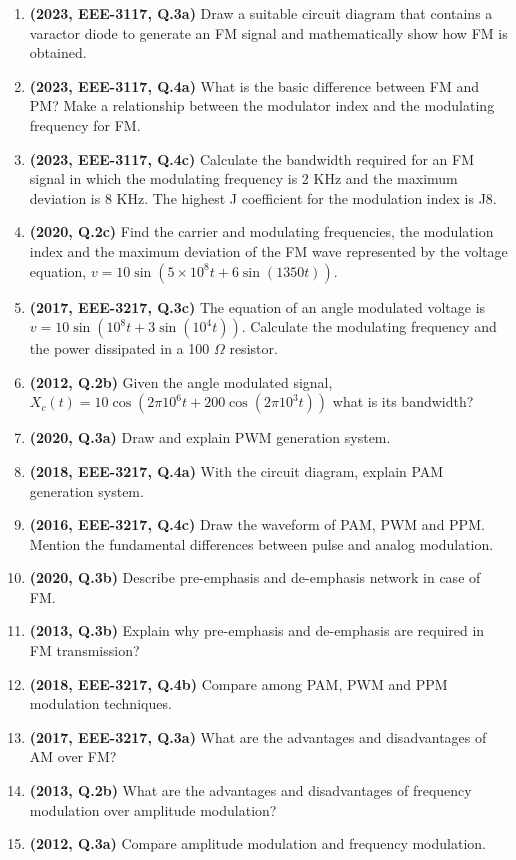 \documentclass[12pt, a4paper]{article}
\begin{document}
	\begin{enumerate}
		\item \textbf{(2023, EEE-3117, Q.3a)} Draw a suitable circuit diagram that contains a varactor diode to generate an FM signal and mathematically show how FM is obtained.
		\item \textbf{(2023, EEE-3117, Q.4a)} What is the basic difference between FM and PM? Make a relationship between the modulator index and the modulating frequency for FM.
		\item \textbf{(2023, EEE-3117, Q.4c)} Calculate the bandwidth required for an FM signal in which the modulating frequency is 2 KHz and the maximum deviation is 8 KHz. The highest J coefficient for the modulation index is J8.
		\item \textbf{(2020, Q.2c)} Find the carrier and modulating frequencies, the modulation index and the maximum deviation of the FM wave represented by the voltage equation, $v = 10\sin(5 \times 10^8 t + 6\sin(1350t))$.
		\item \textbf{(2017, EEE-3217, Q.3c)} The equation of an angle modulated voltage is $v = 10\sin(10^8t + 3\sin(10^4t))$. Calculate the modulating frequency and the power dissipated in a 100 $\Omega$ resistor.
		\item \textbf{(2012, Q.2b)} Given the angle modulated signal, $X_c(t) = 10\cos(2\pi 10^6 t + 200\cos(2\pi 10^3 t))$ what is its bandwidth?
		
		\item \textbf{(2020, Q.3a)} Draw and explain PWM generation system.
		\item \textbf{(2018, EEE-3217, Q.4a)} With the circuit diagram, explain PAM generation system.
		\item \textbf{(2016, EEE-3217, Q.4c)} Draw the waveform of PAM, PWM and PPM. Mention the fundamental differences between pulse and analog modulation.
		
		\item \textbf{(2020, Q.3b)} Describe pre-emphasis and de-emphasis network in case of FM.
		\item \textbf{(2013, Q.3b)} Explain why pre-emphasis and de-emphasis are required in FM transmission?
		
		\item \textbf{(2018, EEE-3217, Q.4b)} Compare among PAM, PWM and PPM modulation techniques.
		
		\item \textbf{(2017, EEE-3217, Q.3a)} What are the advantages and disadvantages of AM over FM?
		\item \textbf{(2013, Q.2b)} What are the advantages and disadvantages of frequency modulation over amplitude modulation?
		\item \textbf{(2012, Q.3a)} Compare amplitude modulation and frequency modulation.
		

\end{enumerate}
\end{document}

